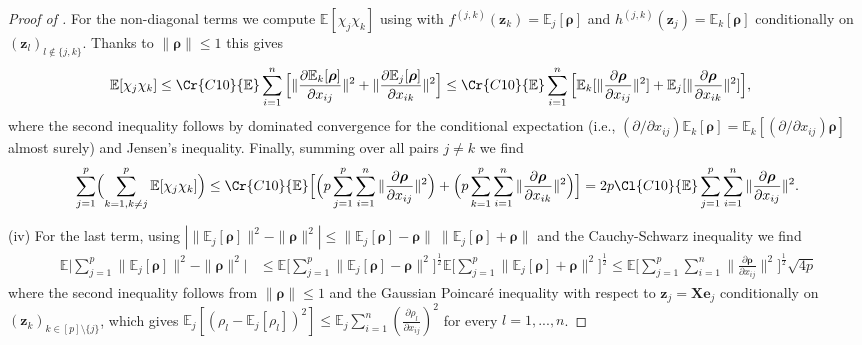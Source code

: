 \documentclass[11pt]{amsart}
\numberwithin{equation}{section}
\numberwithin{equation}{section}
\def\E{{\mathbb{E}}}
\def\mathbold{\boldsymbol} %
\def\be{\mathbold{e}}
\def\bX{\mathbold{X}}\def\hbX{{\widehat{\bX}}}\def\tbX{{\widetilde{\bX}}}\def\bXbar{{\overline \bX}}
\def\bz{\mathbold{z}}\def\zhat{\widehat{z}}\def\ztil{\widetilde{z}}\def\zbar{{\overline z}}
\def\brho{\mathbold{\rho}}\def\rhohat{\widehat{\rho}}\def\hrho{\widehat{\rho}}
\newcommand\pb[1]{{ #1 }}
\begin{document}
\begin{proof}[Proof of ]
    For the non-diagonal terms we compute $\E[\chi_j\chi_k]$
    using  with
    $f^{(j,k)}(\bz_k)=\E_j[\brho]$ and $h^{(j,k)}(\bz_j)=\E_k[\brho]$
    conditionally on $(\bz_l)_{l\notin \{j,k\}}$.
    Thanks to $\|\brho\|\le 1$ this gives
    \begin{align*}
        \E[
        \chi_j\chi_k]
    \le
    \Cr{C10} \E \sum_{i=1}^n
    \pb{\Bigl[}
    \|\frac{\partial \E_k[\brho]}{\partial x_{ij} } \|^2
    + \|\frac{\partial \E_j[\brho]}{\partial x_{ik} } \|^2
    \pb{\Bigr]}
    &\le 
    \Cr{C10} \E \sum_{i=1}^n
    \pb{\Bigl[}
    \E_k[\|\frac{\partial \brho}{\partial x_{ij} } \|^2]
    +\E_j[ \|\frac{\partial \brho }{\partial x_{ik} } \|^2]
    \pb{\Bigl]}
    ,
    \end{align*}
    where the second inequality follows by dominated convergence
    for the conditional expectation
    (i.e., $(\partial/\partial x_{ij})\E_k[\brho] = \E_k[(\partial/\partial x_{ij})\brho]$ almost surely)
    and Jensen's inequality.
    Finally, summing over all pairs $j\ne k$ we find
    $$
        \sum_{j=1}^p
        \Bigl(
        \sum_{k=1, k\ne j}^p
        \E[
        \chi_j\chi_k]
        \Bigr)
        \le \Cr{C10} 
        \E\Bigl[
        \Bigl(
        p
        \sum_{j=1}^p
        \sum_{i=1}^n
        \|\frac{\partial \brho }{\partial x_{i\pb{j}} } \|^2
        \Bigr)
        +
        \Bigl(
        p
        \sum_{k=1}^p
        \sum_{i=1}^n
        \|\frac{\partial \brho }{\partial x_{i\pb{k}} } \|^2
        \Bigr)
        \Bigr]
        =
        2p\Cl{C10} 
        \E
        \sum_{j=1}^p
        \sum_{i=1}^n
        \|\frac{\partial \brho }{\partial x_{i\pb{j}} } \|^2
        .
    $$
    
    (iv)
    For the last term, using
    $|\|\E_j[\brho]\|^2 - \|\brho\|^2| \le \|\E_j[\brho]-\brho\| ~ \|\E_j[\brho]+\brho\|$
    and the Cauchy-Schwarz inequality we find
    \begin{align*}
        \E\Big|\sum_{j=1}^p
        \|\E_j[\brho]\|^2 - \|\brho\|^2
        \Big|
    &\le
    \E\Big[ \sum_{j=1}^p \|\E_j[\brho]-\brho\|^2\Big]^{\frac12}
    \E\Big[ \sum_{j=1}^p \|\E_j[\brho]+\brho\|^2\Big]^{\frac12}
    \le
\E\Big[ \sum_{j=1}^p\sum_{i=1}^n \|\frac{\partial\brho}{\partial x_{ij}}\|^2 \Big]^{\frac12}
    \sqrt{4 p}
    \end{align*}
    where the second inequality follows from $\|\brho\|\le 1$ and
    the Gaussian Poincar\'e inequality
    \cite[Theorem 3.20]{boucheron2013concentration}
    with respect to $\bz_j=\bX\be_j$ conditionally
    on $(\bz_k)_{k\in[p]\setminus\{j\}}$, which gives
    $\E_j[(\rho_l - \E_j[\rho_l])^2] \le 
    \E_j\sum_{i=1}^n (\frac{\partial \rho_l}{\partial x_{ij}})^2
    $ for every $l=1,...,n$.
\end{proof}
\end{document}

